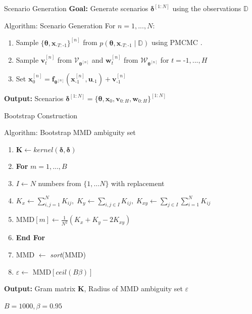 \documentclass[student, noshadow, itr, english, aspectratio=169]{ITR_LSR_slides}
\begin{document}
\begin{frame}{Scenario Generation}
\textbf{Goal:} Generate scenarios $\boldsymbol{\delta}^{[1:N]}$ using the observations $\mathbb{D}$\\
\begin{block}{Algorithm: Scenario Generation}
For $n = 1,...,N$:
\begin{enumerate}
  \item Sample $\{ \boldsymbol{\theta}, \boldsymbol{x}_{\text{-}T:\text{-}1} \}^{[n]}$ from $p\left( \boldsymbol{\theta}, \boldsymbol{x}_{\text{-}T:\text{-}1} \mid \mathbb{D} \right)$ using PMCMC \cite{Robert_24}.
  \item Sample $\boldsymbol{v}_t^{[n]}$ from $\boldsymbol{\mathcal{V}}_{\boldsymbol{\theta}^{[n]}}$ and  $\boldsymbol{w}_t^{[n]}$ from $\boldsymbol{\mathcal{W}}_{\boldsymbol{\theta}^{[n]}}$ for $t = \text{-}1, ..., H$
  \item Set $\boldsymbol{x}_0^{[n]} = \boldsymbol{f}_{\boldsymbol{\theta}^{[n]}} \left( \boldsymbol{x}_{\text{-} 1}^{[n]}, \boldsymbol{u}_{\text{-} 1} \right) + \boldsymbol{v}_{\text{-} 1}^{[n]}$
\end{enumerate}
\textbf{Output:} Scenarios $\boldsymbol{\delta}^{[1:N]} = \{ \boldsymbol{\theta}, \boldsymbol{x}_0, \boldsymbol{v}_{0:H}, \boldsymbol{w}_{0:H}\}^{[1:N]}$
\end{block}
\end{frame}

\begin{frame}{Bootstrap Construction}
\begin{block}{Algorithm: Bootstrap MMD ambiguity set}
\begin{enumerate}
\item $\boldsymbol{K} \leftarrow \textit{kernel}(\boldsymbol{\delta}, \boldsymbol{\delta})$
\item \textbf{For} $m = 1,...,B$
\item \;\; $I \leftarrow N$ numbers from $\{1, \dots N \}$ with replacement
\item \;\; $K_x \leftarrow \sum_{i,j = 1}^N K_{ij}, \;K_y \leftarrow \sum_{i,j \in I} K_{ij}, \;K_{xy} \leftarrow \sum_{j \in I} \sum_{i = 1}^N K_{ij}$
\item \;\; MMD$[m] \leftarrow \frac{1}{N^2} \left( K_x + K_y - 2 K_{xy} \right) $
\item \textbf{End For} 
\item MMD $ \leftarrow$ \textit{sort}(MMD)
\item $\varepsilon \gets$ MMD$\left[ \textit{ceil} (B \beta) \right]$
\end{enumerate}
\textbf{Output:} Gram matrix $\boldsymbol{K}$, Radius of MMD ambiguity set $\varepsilon$
\end{block}
$B = 1000, \beta = 0.95$
\end{frame}
\end{document}
